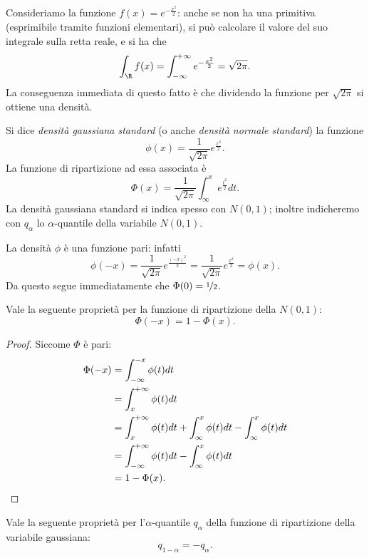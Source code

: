 Consideriamo la funzione $f(x) = e^{-\frac{x^2}{2}}$: anche se non ha una primitiva (esprimibile tramite funzioni elementari), si può calcolare il valore del suo integrale sulla retta reale, e si ha che \[
    \int_\R f(x) = \int_{-\infty}^{+\infty} e^{-\frac{x^2}{2}} = \sqrt{2\pi}.    
\] La conseguenza immediata di questo fatto è che dividendo la funzione per $\sqrt{2\pi}$ si ottiene una densità.

\begin{definition}
     Si dice \emph{densità gaussiana standard} (o anche \emph{densità normale standard}) la funzione \[
        \phi(x) = \frac{1}{\sqrt{2\pi}}e^{\frac{x^2}{2}}.    
    \] La funzione di ripartizione ad essa associata è \[
        \Phi(x) = \frac{1}{\sqrt{2\pi}}\int_{\infty}^x e^{\frac{t^2}{2}}dt.
    \] La densità gaussiana standard si indica spesso con $N(0, 1)$; inoltre indicheremo con $q_\alpha$ lo $\alpha$-quantile della variabile $N(0, 1)$.
\end{definition}

\begin{remark}
    La densità $\phi$ è una funzione pari: infatti \[
        \phi(-x) = \frac{1}{\sqrt{2\pi}}e^{\frac{(-x)^2}{2}} =  \frac{1}{\sqrt{2\pi}}e^{\frac{x^2}{2}} = \phi(x).
    \] Da questo segue immediatamente che $\Phi(0) = \nicefrac{1}{2}$.
\end{remark}

\begin{proposition}
    Vale la seguente proprietà per la funzione di ripartizione della $N(0, 1)$: \[
        \Phi(-x) = 1 - \Phi(x).    
    \]
\end{proposition}
\begin{proof} Siccome $\Phi$ è pari:
    \begin{align*}
        \Phi(-x) &= \int_{-\infty}^{-x} \phi(t)dt \\
        &= \int_x^{+\infty} \phi(t)dt \\
        &= \int_x^{+\infty} \phi(t)dt + \int_{\infty}^{x} \phi(t)dt - \int_{\infty}^{x} \phi(t)dt\\
        &= \int_{-\infty}^{+\infty} \phi(t)dt - \int_{\infty}^{x} \phi(t)dt\\
        &= 1 - \Phi(x). \qedhere
    \end{align*}
\end{proof}
\begin{proposition}
    Vale la seguente proprietà per l'$\alpha$-quantile $q_\alpha$ della funzione di ripartizione della variabile gaussiana: \[
        q_{1-\alpha} = - q_{\alpha}.
    \]
\end{proposition}

